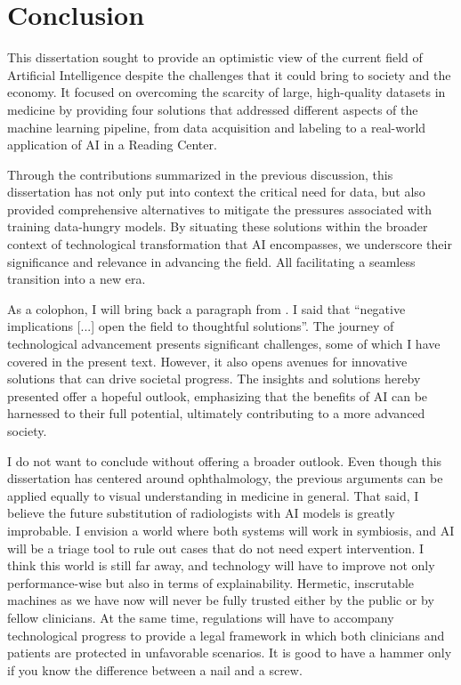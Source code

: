 \graphicspath{{ch8_conclusion/}{Figures/}}

\chapter{Conclusion}
\label{chapter:conclusion}




This dissertation sought to provide an optimistic view of the current field of Artificial Intelligence despite the challenges that it could bring to society and the economy. It focused on overcoming the scarcity of large, high-quality datasets in medicine by providing four solutions that addressed different aspects of the machine learning pipeline, from data acquisition and labeling to a real-world application of AI in a Reading Center.

Through the contributions summarized in the previous discussion, this dissertation has not only put into context the critical need for data, but also provided comprehensive alternatives to mitigate the pressures associated with training data-hungry models. By situating these solutions within the broader context of technological transformation that AI encompasses, we underscore their significance and relevance in advancing the field. All facilitating a seamless transition into a new era.

As a colophon, I will bring back a paragraph from . I said that ``negative implications [...] open the field to thoughtful solutions''. The journey of technological advancement presents significant challenges, some of which I have covered in the present text. However, it also opens avenues for innovative solutions that can drive societal progress. The insights and solutions hereby presented offer a hopeful outlook, emphasizing that the benefits of AI can be harnessed to their full potential, ultimately contributing to a more advanced society. 

I do not want to conclude without offering a broader outlook. Even though this dissertation has centered around ophthalmology, the previous arguments can be applied equally to visual understanding in medicine in general. That said, I believe the future substitution of radiologists with AI models is greatly improbable. I envision a world where both systems will work in symbiosis, and AI will be a triage tool to rule out cases that do not need expert intervention. I think this world is still far away, and technology will have to improve not only performance-wise but also in terms of explainability. Hermetic, inscrutable machines as we have now will never be fully trusted either by the public or by fellow clinicians. At the same time, regulations will have to accompany technological progress to provide a legal framework in which both clinicians and patients are protected in unfavorable scenarios. It is good to have a hammer only if you know the difference between a nail and a screw.

